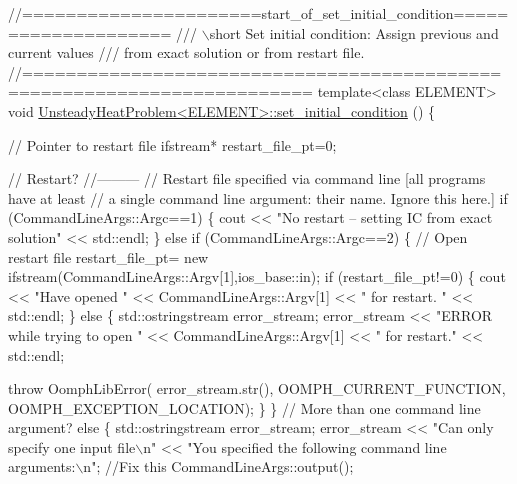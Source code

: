 \begin{DoxyCodeInclude}
\textcolor{comment}{//======================start\_of\_set\_initial\_condition====================}
\textcolor{comment}{/// \(\backslash\)short Set initial condition: Assign previous and current values}
\textcolor{comment}{}\textcolor{comment}{/// from exact solution or from restart file.}
\textcolor{comment}{}\textcolor{comment}{//========================================================================}
\textcolor{keyword}{template}<\textcolor{keyword}{class} ELEMENT>
\textcolor{keywordtype}{void} \hyperlink{classUnsteadyHeatProblem_a98de3ed2d9cf5409323121bbb482bc1b}{UnsteadyHeatProblem<ELEMENT>::set\_initial\_condition}
      ()
\{ 

 \textcolor{comment}{// Pointer to restart file}
 ifstream* restart\_file\_pt=0;

 \textcolor{comment}{// Restart?}
 \textcolor{comment}{//---------}
 \textcolor{comment}{// Restart file specified via command line [all programs have at least}
 \textcolor{comment}{// a single command line argument: their name. Ignore this here.]}
 \textcolor{keywordflow}{if} (CommandLineArgs::Argc==1)
  \{
   cout << \textcolor{stringliteral}{"No restart -- setting IC from exact solution"} << std::endl;
  \}
 \textcolor{keywordflow}{else} \textcolor{keywordflow}{if} (CommandLineArgs::Argc==2)
  \{
   \textcolor{comment}{// Open restart file}
   restart\_file\_pt= \textcolor{keyword}{new} ifstream(CommandLineArgs::Argv[1],ios\_base::in);
   \textcolor{keywordflow}{if} (restart\_file\_pt!=0)
    \{
     cout << \textcolor{stringliteral}{"Have opened "} << CommandLineArgs::Argv[1] << 
      \textcolor{stringliteral}{" for restart. "} << std::endl;
    \}
   \textcolor{keywordflow}{else}
    \{
     std::ostringstream error\_stream;
     error\_stream 
      << \textcolor{stringliteral}{"ERROR while trying to open "} << CommandLineArgs::Argv[1] << 
      \textcolor{stringliteral}{" for restart."} << std::endl;

     \textcolor{keywordflow}{throw} OomphLibError(
      error\_stream.str(),
      OOMPH\_CURRENT\_FUNCTION,
      OOMPH\_EXCEPTION\_LOCATION);
    \}
  \}
 \textcolor{comment}{// More than one command line argument?}
 \textcolor{keywordflow}{else} 
  \{
   std::ostringstream error\_stream;
   error\_stream << \textcolor{stringliteral}{"Can only specify one input file\(\backslash\)n"} 
                << \textcolor{stringliteral}{"You specified the following command line arguments:\(\backslash\)n"};
   \textcolor{comment}{//Fix this}
   CommandLineArgs::output();


\end{DoxyCodeInclude}
